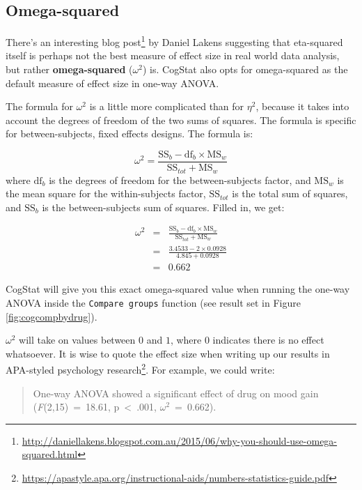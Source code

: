 \documentclass[
  11pt,
  a4paper,
  twoside,symmetric,openright]{book}
\theoremstyle{break}
\theoremstyle{break}
\begin{document}
\subsection{Omega-squared}\label{omega-squared}

There's an interesting blog post\footnote{\url{http://daniellakens.blogspot.com.au/2015/06/why-you-should-use-omega-squared.html}} by Daniel Lakens suggesting that eta-squared itself is perhaps not the best measure of effect size in real world data analysis, but rather \textbf{omega-squared} (\(\omega^2\)) is. CogStat also opts for omega-squared as the default measure of effect size in one-way ANOVA.

The formula for \(\omega^2\) is a little more complicated than for \(\eta^2\), because it takes into account the degrees of freedom of the two sums of squares. The formula is specific for between-subjects, fixed effects designs. The formula is:

\[
\omega^2 = \frac{\mbox{SS}_b - \mbox{df}_b \times \mbox{MS}_w}{\mbox{SS}_{tot} + \mbox{MS}_w}
\]
where \(\mbox{df}_b\) is the degrees of freedom for the between-subjects factor, and \(\mbox{MS}_w\) is the mean square for the within-subjects factor, \(\mbox{SS}_{tot}\) is the total sum of squares, and \(\mbox{SS}_b\) is the between-subjects sum of squares. Filled in, we get:

\[
\begin{array}{rcl}
\omega^2 &=& \frac{\mbox{SS}_b - \mbox{df}_b \times \mbox{MS}_w}{\mbox{SS}_{tot} + \mbox{MS}_w}
    \\
    &=& \frac{3.4533 - 2 \times 0.0928}{4.845 + 0.0928}
    \\
    &=& 0.662
\end{array}
\]

CogStat will give you this exact omega-squared value when running the one-way ANOVA inside the \texttt{Compare\ groups} function (see result set in Figure \ref{fig:cogcompbydrug}).

\(\omega^2\) will take on values between \(0\) and \(1\), where 0 indicates there is no effect whatsoever. It is wise to quote the effect size when writing up our results in APA-styled psychology research\footnote{\url{https://apastyle.apa.org/instructional-aids/numbers-statistics-guide.pdf}}. For example, we could write:

\begin{quote}
One-way ANOVA showed a significant effect of drug on mood gain (\emph{F}(2,15)~=~18.61, p~\textless~.001, \(\omega^2\)~=~0.662).
\end{quote}
\end{document}
